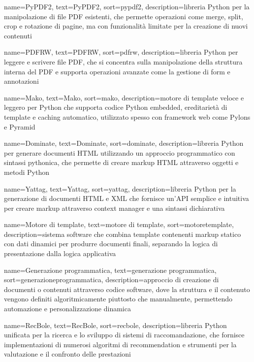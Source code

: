  {
    name=PyPDF2,
    text=PyPDF2,
    sort=pypdf2,
    description={libreria Python per la manipolazione di file PDF esistenti, che permette operazioni come merge, split, crop e rotazione di pagine, ma con funzionalità limitate per la creazione di nuovi contenuti}
}

 {
    name=PDFRW,
    text=PDFRW,
    sort=pdfrw,
    description={libreria Python per leggere e scrivere file PDF, che si concentra sulla manipolazione della struttura interna del PDF e supporta operazioni avanzate come la gestione di form e annotazioni}
}

 {
    name=Mako,
    text=Mako,
    sort=mako,
    description={motore di template veloce e leggero per Python che supporta codice Python embedded, ereditarietà di template e caching automatico, utilizzato spesso con framework web come Pylons e Pyramid}
}

 {
    name=Dominate,
    text=Dominate,
    sort=dominate,
    description={libreria Python per generare documenti HTML utilizzando un approccio programmatico con sintassi pythonica, che permette di creare markup HTML attraverso oggetti e metodi Python}
}

 {
    name=Yattag,
    text=Yattag,
    sort=yattag,
    description={libreria Python per la generazione di documenti HTML e XML che fornisce un'API semplice e intuitiva per creare markup attraverso context manager e una sintassi dichiarativa}
}

 {
    name=Motore di template,
    text=motore di template,
    sort=motoretemplate,
    description={sistema software che combina template contenenti markup statico con dati dinamici per produrre documenti finali, separando la logica di presentazione dalla logica applicativa}
}

 {
    name=Generazione programmatica,
    text=generazione programmatica,
    sort=generazioneprogrammatica,
    description={approccio di creazione di documenti o contenuti attraverso codice software, dove la struttura e il contenuto vengono definiti algoritmicamente piuttosto che manualmente, permettendo automazione e personalizzazione dinamica}
}

 {
    name=RecBole,
    text=RecBole,
    sort=recbole,
    description={libreria Python unificata per la ricerca e lo sviluppo di sistemi di raccomandazione, che fornisce implementazioni di numerosi algoritmi di recommendation e strumenti per la valutazione e il confronto delle prestazioni}
}

